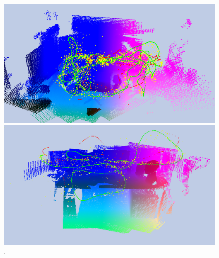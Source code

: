 \begin{figure}
    \centering

	\includegraphics[width=\linewidth]{results/models/chess}
	
	\includegraphics[width=\linewidth]{results/models/heads}
	
	\caption[]{\label{fig:res_visualization2} .}
	
\end{figure}


